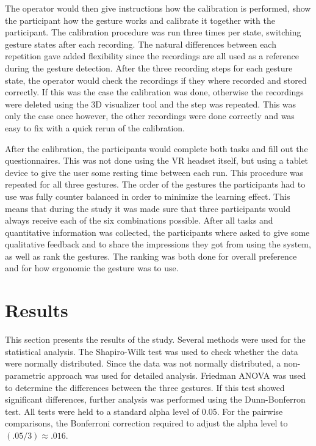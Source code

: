 The operator would then give instructions how the calibration is performed, show the participant how the gesture works and calibrate it together with the participant. The calibration procedure was run three times per state, switching gesture states after each recording. The natural differences between each repetition gave added flexibility since the recordings are all used as a reference during the gesture detection. After the three recording steps for each gesture state, the operator would check the recordings if they where recorded and stored correctly. If this was the case the calibration was done, otherwise the recordings were deleted using the 3D visualizer tool and the step was repeated. This was only the case once however, the other recordings were done correctly and was easy to fix with a quick rerun of the calibration. 

After the calibration, the participants would complete both tasks and fill out the questionnaires. This was not done using the VR headset itself, but using a tablet device to give the user some resting time between each run. This procedure was repeated for all three gestures. 
The order of the gestures the participants had to use was fully counter balanced in order to minimize the learning effect. This means that during the study it was made sure that three participants would always receive each of the six combinations possible. 
After all tasks and quantitative information was collected, the participants where asked to give some qualitative feedback and to share the impressions they got from using the system, as well as rank the gestures. The ranking was both done for overall preference and for how ergonomic the gesture was to use.   


\section{Results}
This section presents the results of the study. Several methods were used for the statistical analysis. The Shapiro-Wilk test was used to check whether the data were normally distributed. Since the data was not normally distributed, a non-parametric approach was used for detailed analysis. Friedman ANOVA was used to determine the differences between the three gestures. If this test showed significant differences, further analysis was performed using the Dunn-Bonferron test. All tests were held to a standard alpha level of 0.05. For the
pairwise comparisons, the Bonferroni correction required to adjust the alpha level to $(.05/3) \approx .016$.

